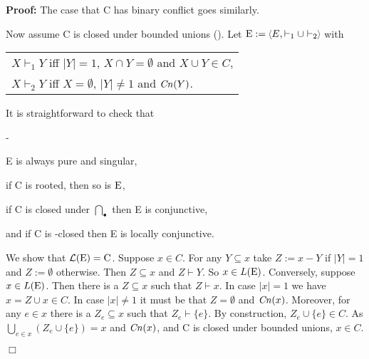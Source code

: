 \documentclass[twocolumn]{article}
\newenvironment{proof}{\begin{trivlist} \item[\hspace{\labelsep}\bf
Proof:]}{\hfill $\Box$\end{trivlist}}
\newenvironment{itemise2}{\begin{list}{{\bf --}}{\leftmargin 15pt
                        \labelwidth\leftmargini\advance\labelwidth-\labelsep
                        \topsep 2pt \itemsep 1pt \parsep 1pt}}{\end{list}}
\newcommand{\turn}{\vdash}                              \newcommand{\dbigcup}{\bigcup_{\uparrow}}		\newcommand{\nbigcup}{\bigcup_{\bullet}}		\newcommand{\nbigcap}{\bigcap_{\bullet}}		\newcommand{\bbigcup}{\overline{\bigcup}}		\newcommand{\bbigcap}{\overline{\bigcap}}		\newcommand{\nbbigcap}{\bbigcap_{\bullet}}		\newcommand{\fbbigcup}{\overline{\bigcup}^f}		\newcommand{\bbbigcup}{\overline{\bigcup}^2}		\newcommand{\dcup}{~~\makebox[0pt]{\LARGE$\cdot$}\makebox[0pt]{$\cup$}~~}
\begin{document}
\begin{proof}
The case that C has binary conflict goes similarly.

Now assume C is closed under bounded unions
(\plat{\bbigcup}). Let $\eE := \tuple{E,\turn_1 \cup \turn_2\;}$ with
\begin{center}
\begin{tabular}{@{}l@{}}
$X \turn_1 Y$ iff $|Y| = 1$, $X \cap Y = \emptyset$ and $X \cup Y
\in C$,\\
$X \turn_2 Y$ iff $X = \emptyset$, $|Y| \neq 1$ and ${\it Cn}(Y)$.
\end{tabular}
\end{center}
It is straightforward to check that
\begin{itemise2}
\item E is always pure and singular,
\item if C is rooted, then so is ${\rm E}$,
\item if C is closed under $\nbigcap$ then E is conjunctive,
\item and if C is \plat{\nbbigcap}-closed then E is locally
conjunctive.
\end{itemise2}
We show that ${\cal L}({\rm E}) = {\rm C}$. Suppose $x \in C$. For any $Y \subseteq x$
take $Z := x-Y$ if $|Y|=1$ and $Z:=\emptyset$ otherwise. Then $Z
\subseteq x$ and $Z \turn Y$. So $x \in L({\rm E})$.
Conversely, suppose $x \in L({\rm E})$. Then there is a $Z \subseteq x$
such that $Z \turn x$. In case $|x|=1$ we have $x = Z \cup x \in
C$. In case $|x| \neq 1$ it must be that $Z=\emptyset$ and ${\it Cn}(x)$.
Moreover, for any $e \in x$ there is a $Z_e \subseteq x$ such that
$Z_e \turn \{e\}$. By construction, $Z_e \cup \{e\} \in C$. As
$\bigcup_{e \in x}(Z_e \cup \{e\}) = x$ and ${\it Cn}(x)$, and C is closed
under bounded unions, $x \in C$.


\end{proof}
\end{document}
